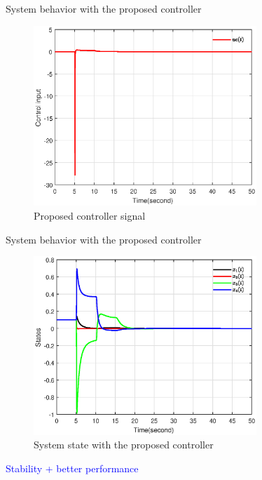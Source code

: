 \documentclass[dvipsnames,mathserif]{beamer}
\begin{document}
{    \begin{frame}
      System behavior with the proposed controller
      \begin{figure}[H]
        \centering
        \includegraphics[width=0.75\textwidth]{2uc.eps}
        \caption{Proposed controller signal }
        \label{fig3.5}
      \end{figure}
    \end{frame}
    \begin{frame}
      System behavior with the proposed controller

      \begin{figure}[H]
        \centering
        \includegraphics[width=0.75\textwidth]{2states.eps}
        \caption{System state with the proposed controller }
        \label{fig3.6}
      \end{figure}

      \textcolor{blue}{ Stability + better performance}

    \end{frame}

}
\end{document}
